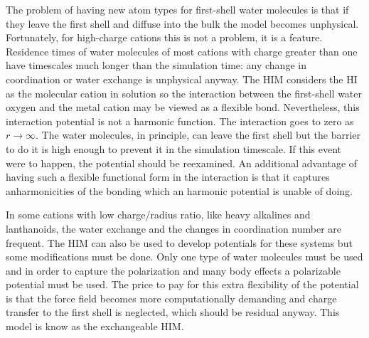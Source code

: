 The problem of having new atom types for first-shell water molecules is that if they leave the 
first shell and diffuse into the bulk the model becomes unphysical. Fortunately, for 
high-charge cations this is not a problem, it is a feature. Residence times of water molecules 
of most cations with charge greater than one have timescales much longer than the simulation 
time: any change in coordination or water exchange is unphysical anyway. The HIM considers the 
HI as the molecular cation in solution so the interaction between the first-shell water oxygen 
and the metal cation may be viewed as a flexible bond. Nevertheless, this interaction 
potential 
is not a harmonic function. The  interaction goes to zero as $r \rightarrow \infty$. The 
water molecules, in principle, can leave the first shell but the barrier to do it is high 
enough 
to prevent it in the simulation timescale. If this event were to happen, the potential 
should 
be reexamined. An additional advantage of having such a flexible functional form in the  
interaction is that it captures anharmonicities of the bonding which an harmonic potential is 
unable of doing. 

In some cations with low charge/radius ratio, like heavy alkalines and lanthanoids, the water 
exchange 
and the changes in coordination number are frequent. The HIM can also be used to develop potentials 
for these systems but some modifications must be done. Only one type of water molecules must be 
used and in order to capture the polarization and many body effects a polarizable potential must 
be used\cite{caralimpio2018looking,thesisNoe,Angew_ESM_2010,JChemPhys_ESM_2015}. The price to pay 
for this extra flexibility of the 
potential is that the force field becomes more computationally demanding and charge transfer to the 
first shell is neglected, which should be residual anyway. This model is know as the exchangeable 
HIM. 

